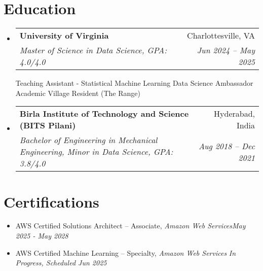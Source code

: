 \documentclass[letterpaper,11pt]{article}
\makeatletter
\newcommand{\resumeItem}[1]{
\justifying
  \item{\small{#1}}
  \vspace{-2px}
}
\newcommand{\resumeSubheading}[4]{
  \item
    \begin{tabular*}{1\textwidth}{l@{\extracolsep{\fill}}r}
      \textbf{\large{#1}} & {\small{#2}} \\
      {\textsl{{#3}}} & {\textsl{\small{#4}}}
    \end{tabular*}
  \vspace{-0.5cm}
}
\newcommand{\resumeSubHeadingListStart}{\begin{itemize}[leftmargin=0.0in, label={}]}
\newcommand{\resumeSubHeadingListEnd}{\end{itemize}}
\newcommand{\resumeItemListStart}{
  \vspace{-5pt}
  \begin{itemize}[leftmargin=0.21in, label=\textbullet]
}
\newcommand{\resumeItemListEnd}{\end{itemize}}
\makeatother
\begin{document}
\vspace{-16pt}
\section{\Large{Education}}
\vspace{3pt}
\resumeSubHeadingListStart

\resumeSubheading
    {University of Virginia}{Charlottesville, VA}
    {Master of Science in Data Science, GPA: 4.0/4.0}{Jun 2024 -- May 2025}

\vspace{6px}
\footnotesize{
Teaching Assistant - Statistical Machine Learning {\textbullet}
Data Science Ambassador {\textbullet}
Academic Village Resident (The Range)\\




}



\resumeSubHeadingListEnd
\vspace{-18pt}
\resumeSubHeadingListStart
\resumeSubheading
    {Birla Institute of Technology and Science \normalsize{(BITS Pilani)}}{Hyderabad, India}
    {Bachelor of Engineering in Mechanical Engineering, Minor in Data Science, GPA: 3.8/4.0}{Aug 2018 -- Dec 2021}

\resumeSubHeadingListEnd




\vspace{-9pt}
\section{\Large{Certifications}}
\vspace{9pt}
\resumeItemListStart

\resumeItem{AWS Certified Solutions Architect – Associate, \textsl{Amazon Web Services}\hfill\sl{May 2025 - May 2028}}

\resumeItem{\vspace{-8pt}AWS Certified Machine Learning – Specialty, \textsl{Amazon Web Services} \hfill\sl{In Progress, Scheduled Jun 2025}}

\resumeItemListEnd
\end{document}
